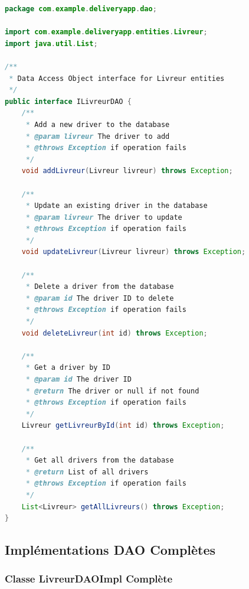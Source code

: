 \documentclass{rapportENSIAS}
\begin{document}
\begin{lstlisting}[language=Java, caption=Interface ILivreurDAO compl\`{e}te]
package com.example.deliveryapp.dao;

import com.example.deliveryapp.entities.Livreur;
import java.util.List;

/**
 * Data Access Object interface for Livreur entities
 */
public interface ILivreurDAO {
    /**
     * Add a new driver to the database
     * @param livreur The driver to add
     * @throws Exception if operation fails
     */
    void addLivreur(Livreur livreur) throws Exception;
    
    /**
     * Update an existing driver in the database
     * @param livreur The driver to update
     * @throws Exception if operation fails
     */
    void updateLivreur(Livreur livreur) throws Exception;
    
    /**
     * Delete a driver from the database
     * @param id The driver ID to delete
     * @throws Exception if operation fails
     */
    void deleteLivreur(int id) throws Exception;
    
    /**
     * Get a driver by ID
     * @param id The driver ID
     * @return The driver or null if not found
     * @throws Exception if operation fails
     */
    Livreur getLivreurById(int id) throws Exception;
    
    /**
     * Get all drivers from the database
     * @return List of all drivers
     * @throws Exception if operation fails
     */
    List<Livreur> getAllLivreurs() throws Exception;
}
\end{lstlisting}

\subsection{Impl\'{e}mentations DAO Compl\`{e}tes}

\subsubsection{Classe LivreurDAOImpl Compl\`{e}te}
\end{document}
